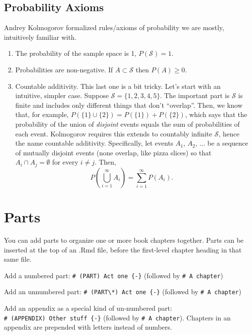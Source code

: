\documentclass[
]{book}
\providecommand{\tightlist}{%
  \setlength{\itemsep}{0pt}\setlength{\parskip}{0pt}}
\theoremstyle{definition}
\theoremstyle{definition}
\theoremstyle{definition}
\theoremstyle{definition}
\theoremstyle{remark}
\begin{document}
\hypertarget{probability-axioms}{%
\section{Probability Axioms}\label{probability-axioms}}

Andrey Kolmogorov formalized rules/axioms of probability we are mostly, intuitively familiar with.

\begin{enumerate}
\def\labelenumi{\arabic{enumi}.}
\tightlist
\item
  The probability of the sample space is 1, \(P(\mathcal{S})=1\).
\item
  Probabilities are non-negative. If \(A\subset\mathcal{S}\) then \(P(A)\geq 0\).
\item
  Countable additivity. This last one is a bit tricky. Let's start with an intuitive, simpler case. Suppose \(\mathcal{S} = \{1,2,3,4,5\}\). The important part is \(\mathcal{S}\) is finite and includes only different things that don't ``overlap''. Then, we know that, for example, \(P(\{1\}\cup \{2\}) = P(\{1\}) + P(\{2\})\), which says that the probability of the union of \emph{disjoint} events equals the sum of probabilities of each event. Kolmogorov requires this extends to countably infinite \(\mathcal{S}\), hence the name countable additivity. Specifically, let events \(A_1\), \(A_2\), \(\ldots\) be a sequence of mutually disjoint events (none overlap, like pizza slices) so that \(A_i \cap A_j = \emptyset\) for every \(i\ne j\). Then,
  \[P\left(\bigcup_{i=1}^\infty A_i\right) = \sum_{i=1}^\infty P(A_i).\]
\end{enumerate}

\hypertarget{parts}{%
\chapter{Parts}\label{parts}}

You can add parts to organize one or more book chapters together. Parts can be inserted at the top of an .Rmd file, before the first-level chapter heading in that same file.

Add a numbered part: \texttt{\#\ (PART)\ Act\ one\ \{-\}} (followed by \texttt{\#\ A\ chapter})

Add an unnumbered part: \texttt{\#\ (PART\textbackslash{}*)\ Act\ one\ \{-\}} (followed by \texttt{\#\ A\ chapter})

Add an appendix as a special kind of un-numbered part: \texttt{\#\ (APPENDIX)\ Other\ stuff\ \{-\}} (followed by \texttt{\#\ A\ chapter}). Chapters in an appendix are prepended with letters instead of numbers.
\end{document}
